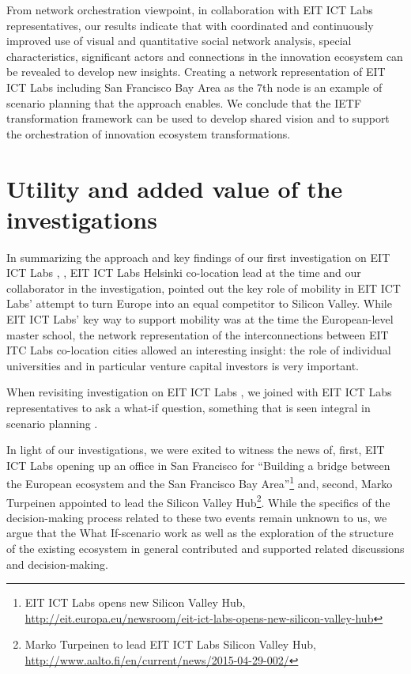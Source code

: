 From network orchestration viewpoint, in collaboration with EIT ICT Labs representatives, our results indicate that with coordinated and continuously improved use of visual and quantitative social network analysis, special characteristics, significant actors and connections in the innovation ecosystem can be revealed to develop new insights. Creating a network representation of EIT ICT Labs including San Francisco Bay Area as the 7th node is an example of scenario planning that the approach enables. We conclude that the IETF transformation framework can be used to develop shared vision and to support the orchestration of innovation ecosystem transformations.

\section{Utility and added value of the investigations}

In summarizing the approach and key findings of our first investigation on EIT ICT Labs \citep{Still2011ExplainingEurope}, \cite{Turpeinen2011}, EIT ICT Labs Helsinki co-location lead at the time and our collaborator in the investigation, pointed out the key role of mobility in EIT ICT Labs' attempt to turn Europe into an equal competitor to Silicon Valley. While EIT ICT Labs' key way to support mobility was at the time the European-level master school, the network representation of the interconnections between EIT ITC Labs co-location cities allowed an interesting insight: the role of individual universities and in particular venture capital investors is very important.

When revisiting investigation on EIT ICT Labs \citep{Still2012ParadigmDigital,Still2014InsightsVisualisations}, we joined with EIT ICT Labs representatives to ask a what-if question, something that is seen integral in scenario planning \citep{Schoemaker1995ScenarioThinking}.

In light of our investigations, we were exited to witness the news of, first, EIT ICT Labs opening up an office in San Francisco for ``Building a bridge between the European ecosystem and the San Francisco Bay Area''\footnote{EIT ICT Labs opens new Silicon Valley Hub, \url{http://eit.europa.eu/newsroom/eit-ict-labs-opens-new-silicon-valley-hub}} and, second, Marko Turpeinen appointed to lead the Silicon Valley Hub\footnote{Marko Turpeinen to lead EIT ICT Labs Silicon Valley Hub,  \url{http://www.aalto.fi/en/current/news/2015-04-29-002/}}. While the specifics of the decision-making process related to these two events remain unknown to us, we argue that the What If-scenario work as well as the exploration of the structure of the existing ecosystem in general contributed and supported related discussions and decision-making.

